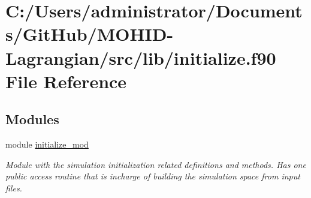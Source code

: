 \hypertarget{initialize_8f90}{}\section{C\+:/\+Users/administrator/\+Documents/\+Git\+Hub/\+M\+O\+H\+I\+D-\/\+Lagrangian/src/lib/initialize.f90 File Reference}
\label{initialize_8f90}
\subsection*{Modules}
\begin{DoxyCompactItemize}
\item 
module \mbox{\hyperlink{namespaceinitialize__mod}{initialize\+\_\+mod}}
\begin{DoxyCompactList}\small\item\em Module with the simulation initialization related definitions and methods. Has one public access routine that is incharge of building the simulation space from input files. \end{DoxyCompactList}\end{DoxyCompactItemize}
